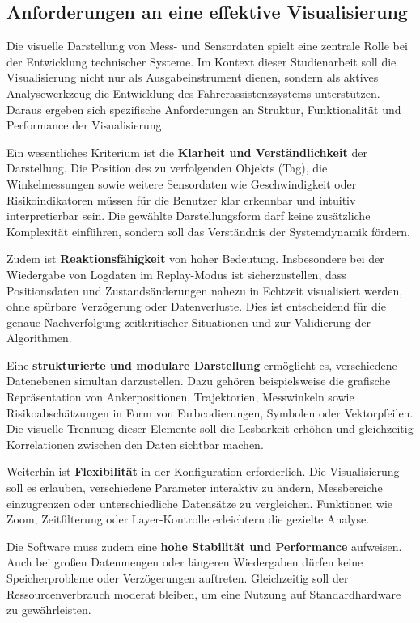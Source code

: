 \documentclass[a4paper, 12pt]{article} %
\begin{document}
\subsection{Anforderungen an eine effektive Visualisierung}

Die visuelle Darstellung von Mess- und Sensordaten spielt eine zentrale Rolle bei der Entwicklung technischer Systeme. 
Im Kontext dieser Studienarbeit soll die Visualisierung nicht nur als Ausgabeinstrument dienen, sondern als aktives Analysewerkzeug die 
Entwicklung des Fahrerassistenzsystems unterstützen. Daraus ergeben sich spezifische Anforderungen an Struktur, Funktionalität und Performance der 
Visualisierung.

Ein wesentliches Kriterium ist die \textbf{Klarheit und Verständlichkeit} der Darstellung. Die Position des zu 
verfolgenden Objekts (Tag), die Winkelmessungen sowie weitere Sensordaten wie Geschwindigkeit oder Risikoindikatoren müssen 
für die Benutzer klar erkennbar und intuitiv interpretierbar sein. Die gewählte Darstellungsform darf keine zusätzliche Komplexität 
einführen, sondern soll das Verständnis der Systemdynamik fördern.

Zudem ist \textbf{Reaktionsfähigkeit} von hoher Bedeutung. Insbesondere bei der Wiedergabe von Logdaten im Replay-Modus ist sicherzustellen, 
dass Positionsdaten und Zustandsänderungen nahezu in Echtzeit visualisiert werden, ohne spürbare Verzögerung oder Datenverluste. Dies ist entscheidend
 für die genaue Nachverfolgung zeitkritischer Situationen und zur Validierung der Algorithmen.

Eine \textbf{strukturierte und modulare Darstellung} ermöglicht es, verschiedene Datenebenen simultan darzustellen. 
Dazu gehören beispielsweise die grafische Repräsentation von Ankerpositionen, Trajektorien, Messwinkeln sowie Risikoabschätzungen in Form von 
Farbcodierungen, Symbolen oder Vektorpfeilen. Die visuelle Trennung dieser Elemente soll die Lesbarkeit erhöhen und gleichzeitig Korrelationen zwischen 
den Daten sichtbar machen.

Weiterhin ist \textbf{Flexibilität} in der Konfiguration erforderlich. Die Visualisierung soll es erlauben, verschiedene Parameter interaktiv zu 
ändern, Messbereiche einzugrenzen oder unterschiedliche Datensätze zu vergleichen. Funktionen wie Zoom, Zeitfilterung oder Layer-Kontrolle erleichtern 
die gezielte Analyse.

Die Software muss zudem eine \textbf{hohe Stabilität und Performance} aufweisen. Auch bei großen Datenmengen oder längeren Wiedergaben dürfen keine 
Speicherprobleme oder Verzögerungen auftreten. Gleichzeitig soll der Ressourcenverbrauch moderat bleiben, um eine Nutzung auf Standardhardware zu 
gewährleisten.
\end{document}

